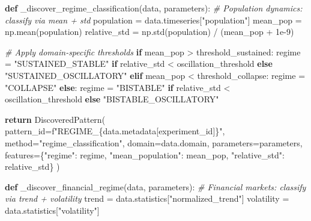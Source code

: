 \documentclass[
]{article}
\newenvironment{Shaded}{}{}
\newcommand{\CommentTok}[1]{\textcolor[rgb]{0.38,0.63,0.69}{\textit{#1}}}
\newcommand{\ControlFlowTok}[1]{\textcolor[rgb]{0.00,0.44,0.13}{\textbf{#1}}}
\newcommand{\FloatTok}[1]{\textcolor[rgb]{0.25,0.63,0.44}{#1}}
\newcommand{\KeywordTok}[1]{\textcolor[rgb]{0.00,0.44,0.13}{\textbf{#1}}}
\newcommand{\NormalTok}[1]{#1}
\newcommand{\OperatorTok}[1]{\textcolor[rgb]{0.40,0.40,0.40}{#1}}
\newcommand{\SpecialCharTok}[1]{\textcolor[rgb]{0.25,0.44,0.63}{#1}}
\newcommand{\SpecialStringTok}[1]{\textcolor[rgb]{0.73,0.40,0.53}{#1}}
\newcommand{\StringTok}[1]{\textcolor[rgb]{0.25,0.44,0.63}{#1}}
\begin{document}
\begin{Shaded}
\begin{Highlighting}[]
\KeywordTok{def}\NormalTok{ \_discover\_regime\_classification(data, parameters):}
    \CommentTok{\# Population dynamics: classify via mean + std}
\NormalTok{    population }\OperatorTok{=}\NormalTok{ data.timeseries[}\StringTok{"population"}\NormalTok{]}
\NormalTok{    mean\_pop }\OperatorTok{=}\NormalTok{ np.mean(population)}
\NormalTok{    relative\_std }\OperatorTok{=}\NormalTok{ np.std(population) }\OperatorTok{/}\NormalTok{ (mean\_pop }\OperatorTok{+} \FloatTok{1e{-}9}\NormalTok{)}

    \CommentTok{\# Apply domain{-}specific thresholds}
    \ControlFlowTok{if}\NormalTok{ mean\_pop }\OperatorTok{\textgreater{}}\NormalTok{ threshold\_sustained:}
\NormalTok{        regime }\OperatorTok{=} \StringTok{"SUSTAINED\_STABLE"} \ControlFlowTok{if}\NormalTok{ relative\_std }\OperatorTok{\textless{}}\NormalTok{ oscillation\_threshold }\ControlFlowTok{else} \StringTok{"SUSTAINED\_OSCILLATORY"}
    \ControlFlowTok{elif}\NormalTok{ mean\_pop }\OperatorTok{\textless{}}\NormalTok{ threshold\_collapse:}
\NormalTok{        regime }\OperatorTok{=} \StringTok{"COLLAPSE"}
    \ControlFlowTok{else}\NormalTok{:}
\NormalTok{        regime }\OperatorTok{=} \StringTok{"BISTABLE"} \ControlFlowTok{if}\NormalTok{ relative\_std }\OperatorTok{\textless{}}\NormalTok{ oscillation\_threshold }\ControlFlowTok{else} \StringTok{"BISTABLE\_OSCILLATORY"}

    \ControlFlowTok{return}\NormalTok{ DiscoveredPattern(}
\NormalTok{        pattern\_id}\OperatorTok{=}\SpecialStringTok{f"REGIME\_}\SpecialCharTok{\{}\NormalTok{data}\SpecialCharTok{.}\NormalTok{metadata[}\StringTok{\textquotesingle{}experiment\_id\textquotesingle{}}\NormalTok{]}\SpecialCharTok{\}}\SpecialStringTok{"}\NormalTok{,}
\NormalTok{        method}\OperatorTok{=}\StringTok{"regime\_classification"}\NormalTok{,}
\NormalTok{        domain}\OperatorTok{=}\NormalTok{data.domain,}
\NormalTok{        parameters}\OperatorTok{=}\NormalTok{parameters,}
\NormalTok{        features}\OperatorTok{=}\NormalTok{\{}\StringTok{"regime"}\NormalTok{: regime, }\StringTok{"mean\_population"}\NormalTok{: mean\_pop, }\StringTok{"relative\_std"}\NormalTok{: relative\_std\}}
\NormalTok{    )}

\KeywordTok{def}\NormalTok{ \_discover\_financial\_regime(data, parameters):}
    \CommentTok{\# Financial markets: classify via trend + volatility}
\NormalTok{    trend }\OperatorTok{=}\NormalTok{ data.statistics[}\StringTok{"normalized\_trend"}\NormalTok{]}
\NormalTok{    volatility }\OperatorTok{=}\NormalTok{ data.statistics[}\StringTok{"volatility"}\NormalTok{]}


\end{Highlighting}
\end{Shaded}
\end{document}
